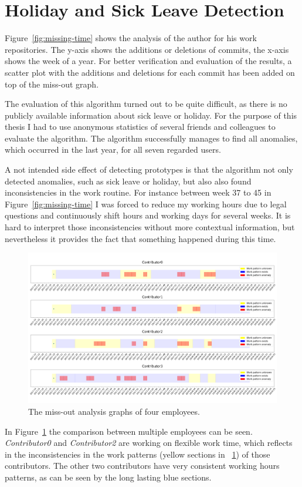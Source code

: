 \section{Holiday and Sick Leave Detection}

Figure~\ref{fig:missing-time} shows the analysis of the author for his work repositories.
The y-axis shows the additions or deletions of commits, the x-axis shows the week of a year.
For better verification and evaluation of the results, a scatter plot with the additions and deletions for each commit has been added on top of the miss-out graph.

The evaluation of this algorithm turned out to be quite difficult, as there is no publicly available information about sick leave or holiday.
For the purpose of this thesis I had to use anonymous statistics of several friends and colleagues to evaluate the algorithm.
The algorithm successfully manages to find all anomalies, which occurred in the last year, for all seven regarded users.

A not intended side effect of detecting prototypes is that the algorithm not only detected anomalies, such as sick leave or holiday, but also also found inconsistencies in the work routine.
For instance between week 37 to 45 in Figure~\ref{fig:missing-time} I was forced to reduce my working hours due to legal questions and continuously shift hours and working days for several weeks.
It is hard to interpret those inconsistencies without more contextual information, but nevertheless it provides the fact that something happened during this time.

\begin{figure}[H]
    \includegraphics[scale=0.20]{./graphs/analysis/work-time-analysis-comparison}
    \centering
    \caption{The miss-out analysis graphs of four employees.}\label{fig:miss-out-comparison}
\end{figure}

In Figure~\ref{fig:miss-out-comparison} the comparison between multiple employees can be seen.
\emph{Contributor0} and \emph{Contributor2} are working on flexible work time, which reflects in the inconsistencies in the work patterns (yellow sections in ~\ref{fig:miss-out-comparison}) of those contributors.
The other two contributors have very consistent working hours patterns, as can be seen by the long lasting blue sections.
